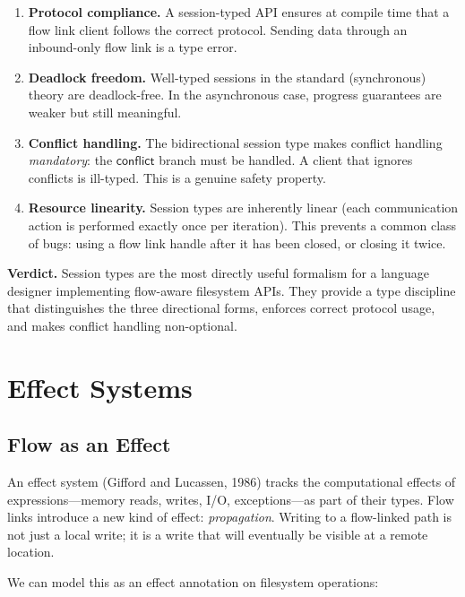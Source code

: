 \documentclass[11pt]{article}
\newcommand{\sess}[1]{\mathsf{#1}}
\begin{document}
\begin{enumerate}
  \item \textbf{Protocol compliance.} A session-typed API ensures at compile
    time that a flow link client follows the correct protocol. Sending data
    through an inbound-only flow link is a type error.
  \item \textbf{Deadlock freedom.} Well-typed sessions in the standard
    (synchronous) theory are deadlock-free. In the asynchronous case,
    progress guarantees are weaker but still meaningful.
  \item \textbf{Conflict handling.} The bidirectional session type makes
    conflict handling \emph{mandatory}: the $\sess{conflict}$ branch must be
    handled. A client that ignores conflicts is ill-typed. This is a genuine
    safety property.
  \item \textbf{Resource linearity.} Session types are inherently linear (each
    communication action is performed exactly once per iteration). This
    prevents a common class of bugs: using a flow link handle after it has been
    closed, or closing it twice.
\end{enumerate}

\textbf{Verdict.} Session types are the most directly useful formalism for a
language designer implementing flow-aware filesystem APIs. They provide a type
discipline that distinguishes the three directional forms, enforces correct
protocol usage, and makes conflict handling non-optional.


\section{Effect Systems}\label{sec:effects}

\subsection{Flow as an Effect}

An effect system (Gifford and Lucassen, 1986) tracks the computational effects
of expressions---memory reads, writes, I/O, exceptions---as part of their
types. Flow links introduce a new kind of effect: \emph{propagation}. Writing
to a flow-linked path is not just a local write; it is a write that will
eventually be visible at a remote location.

We can model this as an effect annotation on filesystem operations:
\end{document}
